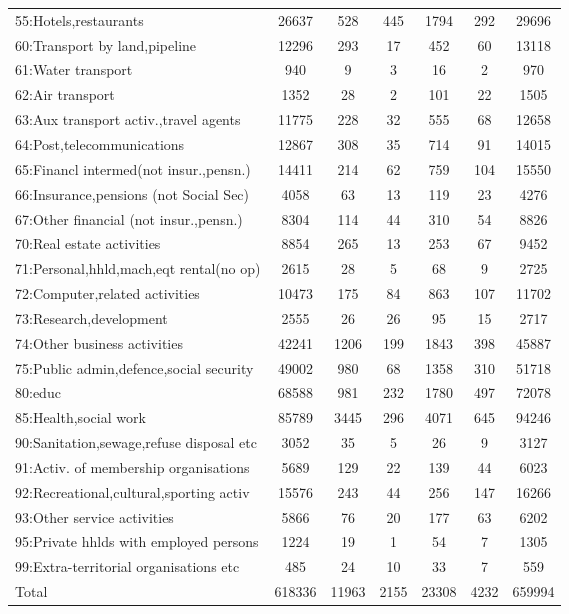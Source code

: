 {\begin{longtable}{l*{6}{c}}
55:Hotels,restaurants&    26637&      528&      445&     1794&      292&    29696\\
60:Transport by land,pipeline&    12296&      293&       17&      452&       60&    13118\\
61:Water transport&      940&        9&        3&       16&        2&      970\\
62:Air transport&     1352&       28&        2&      101&       22&     1505\\
63:Aux transport activ.,travel agents&    11775&      228&       32&      555&       68&    12658\\
64:Post,telecommunications&    12867&      308&       35&      714&       91&    14015\\
65:Financl intermed(not insur.,pensn.)&    14411&      214&       62&      759&      104&    15550\\
66:Insurance,pensions (not Social Sec)&     4058&       63&       13&      119&       23&     4276\\
67:Other financial (not insur.,pensn.)&     8304&      114&       44&      310&       54&     8826\\
70:Real estate activities&     8854&      265&       13&      253&       67&     9452\\
71:Personal,hhld,mach,eqt rental(no op)&     2615&       28&        5&       68&        9&     2725\\
72:Computer,related activities&    10473&      175&       84&      863&      107&    11702\\
73:Research,development&     2555&       26&       26&       95&       15&     2717\\
74:Other business activities&    42241&     1206&      199&     1843&      398&    45887\\
75:Public admin,defence,social security&    49002&      980&       68&     1358&      310&    51718\\
80:educ   &    68588&      981&      232&     1780&      497&    72078\\
85:Health,social work&    85789&     3445&      296&     4071&      645&    94246\\
90:Sanitation,sewage,refuse disposal etc&     3052&       35&        5&       26&        9&     3127\\
91:Activ. of membership organisations&     5689&      129&       22&      139&       44&     6023\\
92:Recreational,cultural,sporting activ&    15576&      243&       44&      256&      147&    16266\\
93:Other service activities&     5866&       76&       20&      177&       63&     6202\\
95:Private hhlds with employed persons&     1224&       19&        1&       54&        7&     1305\\
99:Extra-territorial organisations etc&      485&       24&       10&       33&        7&      559\\
Total     &   618336&    11963&     2155&    23308&     4232&   659994\\
\hline\hline
\end{longtable}
}
